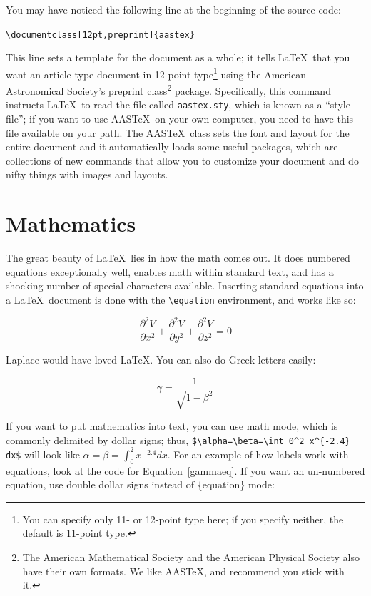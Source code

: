 \documentclass[12pt,preprint]{aastex}
\begin{document}
        You may have noticed the following line at the beginning of the
source code: \begin{center} {\verb&\documentclass[12pt,preprint]{aastex}&}
\end{center} \noindent This line sets a template for the document as a
whole; it tells \LaTeX\ that you want an article-type document in
12-point type\footnote{You can specify only 11- or 12-point type here;
  if you specify neither, the default is 11-point type.} using the
American Astronomical Society's preprint class\footnote{The American
  Mathematical Society and the American Physical Society also have their
  own formats.  We like AAS\TeX, and recommend you stick with it.}
package.  Specifically, this command instructs \LaTeX \ to read the file
called \verb$aastex.sty$, which is known as a ``style file''; if you
want to use AAS\TeX \ on your own computer, you need to have this file
available on your path. The AAS\TeX\ class sets the font and layout for
the entire document and it automatically loads some useful packages,
which are collections of new commands that allow you to customize your
document and do nifty things with images and layouts.


\section{Mathematics}\label{mathsec}

        The great beauty of \LaTeX\ lies in how the math comes out.  It
does numbered equations exceptionally well, enables math within standard
text, and has a shocking number of special characters available. 
Inserting standard equations into a \LaTeX\ document is done with the
\verb&\equation& environment, and works like so:

\begin{equation} \label{laplacian}
\frac{\partial^2 V} {\partial x^2}+\frac{\partial^2 V}
{\partial y^2} + \frac{\partial^2 V}{\partial z^2}=0
\end{equation}

Laplace would have loved \LaTeX.  You can also do Greek letters easily:

\begin{equation} \label{gammaeq}
\gamma=\frac{1}{\sqrt{1-\beta^2}}
\end{equation}

\noindent If you want to put mathematics into text, you can use math
mode, which is commonly delimited by dollar signs; thus,
\verb&$\alpha=\beta=\int_0^2 x^{-2.4} dx$& will look like
$\alpha=\beta=\int_0^2 x^{-2.4} dx$.  For an example of how labels work
with equations, look at the code for Equation~\ref{gammaeq}. If you want
an un-numbered equation, use double dollar signs instead of \{equation\}
mode:
\end{document}
